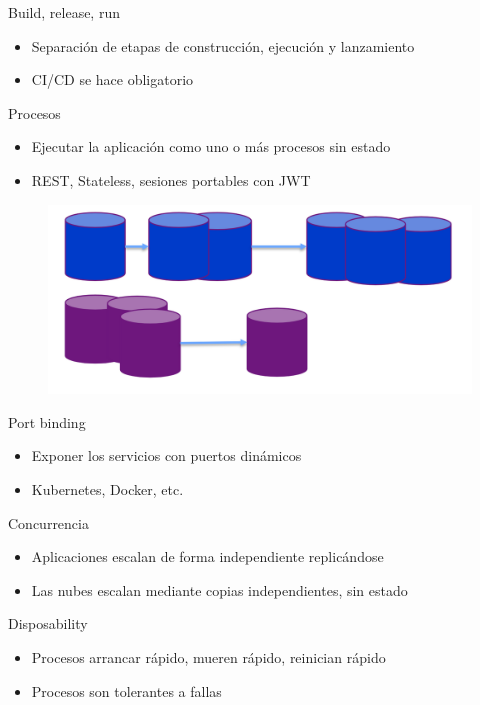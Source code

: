 \documentclass[aspectratio=169]{beamer}
\begin{document}
\begin{frame}{Build, release, run}
\begin{itemize}
	\item Separación de etapas de construcción, ejecución y lanzamiento
	\item CI/CD se hace obligatorio
\end{itemize}
\end{frame}

\begin{frame}{Procesos}
\begin{itemize}
	\item Ejecutar la aplicación como uno o más procesos sin estado
	\item REST, Stateless, sesiones portables con JWT
\end{itemize}
\begin{figure}
	\centering
	\includegraphics[width=0.5\linewidth]{Images/services}
\end{figure}
\end{frame}


\begin{frame}{Port binding}
\begin{itemize}
	\item Exponer los servicios con puertos dinámicos
	\item Kubernetes, Docker, etc.
\end{itemize}
\end{frame}

\begin{frame}{Concurrencia}
\begin{itemize}
	\item Aplicaciones escalan de forma independiente replicándose
	\item Las nubes escalan mediante copias independientes, sin estado
\end{itemize}
\end{frame}

\begin{frame}{Disposability}
\begin{itemize}
	\item Procesos arrancar rápido, mueren rápido, reinician rápido
	\item Procesos son tolerantes a fallas
\end{itemize}

\end{frame}
\end{document}
